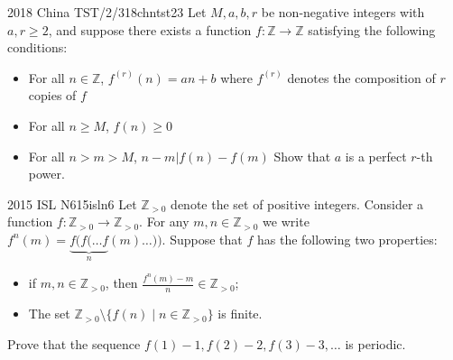 \documentclass[11pt]{scrartcl}
\begin{document}
\begin{problem}{2018 China TST/2/3}{18chntst23}
  Let $M,a,b,r$ be non-negative integers with $a,r\ge 2$, and suppose there exists a function $f:\mathbb{Z}\rightarrow\mathbb{Z}$ satisfying the following conditions:
  \begin{itemize}
    \item For all $n\in \mathbb{Z}$, $f^{(r)}(n)=an+b$ where $f^{(r)}$ denotes the composition of $r$ copies of $f$
    \item For all $n\ge M$, $f(n)\ge 0$
    \item For all $n>m>M$, $n-m|f(n)-f(m)$
  Show that $a$ is a perfect $r$-th power.
  \end{itemize}
\end{problem}

\begin{problem}{2015 ISL N6}{15isln6}
  Let $\mathbb{Z}_{>0}$ denote the set of positive integers. Consider a function $f: \mathbb{Z}_{>0} \to \mathbb{Z}_{>0}$. For any $m, n \in \mathbb{Z}_{>0}$ we write $f^n(m) = \underbrace{f(f(\ldots f}_{n}(m)\ldots))$. Suppose that $f$ has the following two properties:

\begin{itemize}
  \item if $m, n \in \mathbb{Z}_{>0}$, then $\frac{f^n(m) - m}{n} \in \mathbb{Z}_{>0}$;
  \item The set $\mathbb{Z}_{>0} \setminus \{f(n) \mid n\in \mathbb{Z}_{>0}\}$ is finite.
\end{itemize} 

Prove that the sequence $f(1) - 1, f(2) - 2, f(3) - 3, \ldots$ is periodic.
\end{problem}
\end{document}
